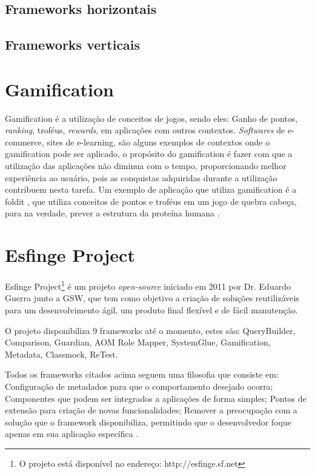 \subsection{Frameworks horizontais}

\subsection{Frameworks verticais}

\section{Gamification}
\par Gamification é a utilização de conceitos de jogos, sendo eles: Ganho de pontos, \textit{ranking}, troféus, \textit{rewards}, em aplicações com outros contextos. \textit{Softwares} de e-commerce, sites de e-learning, são alguns exemplos de contextos onde o gamification pode ser aplicado, o propósito do gamification é fazer com que a utilização das aplicações não diminua com o tempo, proporcionando melhor experiência ao usuário, pois as conquistas adquiridas durante a utilização contribuem nesta tarefa. Um exemplo de aplicação que utiliza gamification é a foldit \cite{burke2012behind}, que utiliza conceitos de pontos e troféus em um jogo de quebra cabeça, para na verdade, prever a estrutura da proteína humana \cite{deterding2011gamification}.

\section{Esfinge Project}

\par Esfinge Project\footnote{O projeto está disponível no endereço: http://esfinge.sf.net} é um projeto \textit{open-source} iniciado em 2011 por Dr. Eduardo Guerra junto a GSW, que tem como objetivo a criação de soluções reutilizáveis para um desenvolvimento ágil, um produto final flexível e de fácil manutenção.
\par O projeto disponibiliza 9 frameworks até o momento, estes são: QueryBuilder, Comparison, Guardian, AOM Role Mapper, SystemGlue, Gamification, Metadata, Classmock, ReTest.
\par Todos os frameworks citados acima seguem uma filosofia que consiste em: Configuração de metadados para que o comportamento desejado ocorra; Componentes que podem ser integrados a aplicações de forma simples; Pontos de extensão para criação de novas funcionalidades; Remover a preocupação com a solução que o framework disponibiliza, permitindo que o desenvolvedor foque apenas em sua aplicação específica \cite{esfinge2011}.

